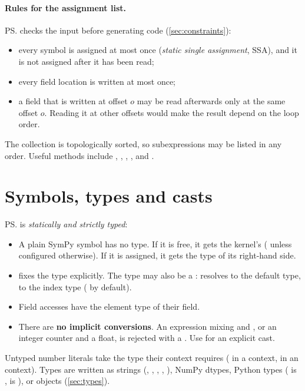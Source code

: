 \paragraph{Rules for the assignment list.}
\ps{} checks the input before generating code (\cref{sec:constraints}):
\begin{itemize}
  \item every symbol is assigned at most once (\emph{static single assignment}, SSA), and
        it is not assigned after it has been read;
  \item every field location is written at most once;
  \item a field that is written at offset $o$ may be read afterwards only at the same
        offset $o$. Reading it at other offsets would make the result depend on the
        loop order.
\end{itemize}
The collection is topologically sorted, so subexpressions may be listed in any order.
Useful methods include , ,
, ,
 and .

\section{Symbols, types and casts}\label{sec:types-frontend}

\ps{} is \emph{statically and strictly typed}:
\begin{itemize}
  \item A plain SymPy symbol has no type. If it is free, it gets the kernel's
         ( unless configured otherwise). If it is
        assigned, it gets the type of its right-hand side.
  \item {} fixes the type explicitly. The type may also
        be a :  resolves to the default type,
         to the index type ( by default).
  \item Field accesses have the element type of their field.
  \item There are \textbf{no implicit conversions}. An expression mixing
         and , or an integer counter and a float, is
        rejected with a . Use  for
        an explicit cast.
\end{itemize}
Untyped number literals take the type their context requires ( in a
 context,  in an  context). Types are written as strings
(, , , , ),
NumPy dtypes, Python types ( is ,  is
), or  objects (\cref{sec:types}).

